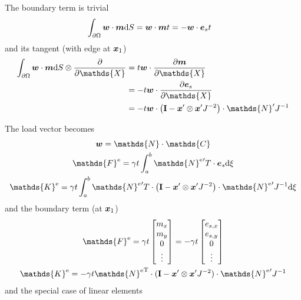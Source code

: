 \documentclass[a4paper,11pt]{article}
\renewcommand{\to}[1]{\text{\boldmath $#1$}} %
\newcommand{\ts}[1]{\text{\boldmath $\mathrm{#1}$}} %
\newcommand{\uv}[1]{\mathds{#1}}
\newcommand{\um}[1]{\mathds{#1}}
\newcommand{\intd}[1]{\mathrm{d}#1}
\newcommand{\pderiv}[2]{\frac{\partial#1}{\partial#2}}
\newcommand{\T}{\mathrm{T}}
\newcommand{\element}{\mathrm{e}}
\begin{document}
The boundary term is trivial
\begin{align}
 &\int_{\partial\Omega} \to w\cdot \to m\intd S = \to w \cdot\to m t = - \to w \cdot \to e_s t
\end{align}
and its tangent (with edge at $\to x_1$)
\begin{align}
 \int_{\partial\Omega} \to w\cdot \to m\intd S\otimes \pderiv{}{\uv X} &= t \to w\cdot\pderiv{\to m}{\uv X}\\
 &= -t \to w\cdot\pderiv{\to e_s}{\uv X}\\
 &= -t \to w\cdot \left(\ts I-\to x'\otimes\to x' J^{-2}\right)\cdot \um N' J^{-1}
\end{align}

The load vector becomes
\begin{gather}
 \to w = \um N\cdot\uv C\\
 \uv F^\element = \gamma t \int_a^b {\um N^\element}'^\T\cdot \to e_s \intd\xi\\
 \um K^\element = \gamma t \int_a^b {\um N^\element}'^\T\cdot \left(\ts I-\to x'\otimes\to x' J^{-2}\right)\cdot{\um N^\element}' J^{-1} \intd\xi
\end{gather}
and the boundary term (at $\to x_1$)
\begin{gather}
 \uv F^\element = \gamma t \begin{bmatrix}m_x\\m_y\\0\\\vdots\end{bmatrix} = - \gamma t \begin{bmatrix}e_{s,x}\\e_{s,y}\\0\\\vdots\end{bmatrix}\\
 \um K^\element = -\gamma t {\um N^\element}^\T \cdot (\ts I - \to x'\otimes \to x' J^{-2})\cdot {\um N^\element}' J^{-1}
\end{gather}
and the special case of linear elements
\end{document}
